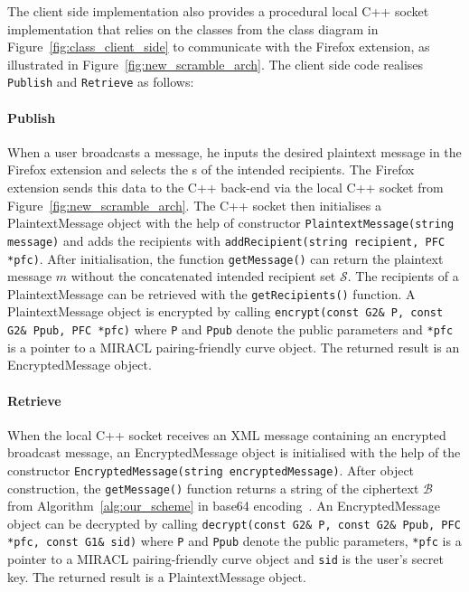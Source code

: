 The client side implementation also provides a procedural local C++ socket implementation that relies on the classes from the class diagram in Figure~\ref{fig:class_client_side} to communicate with the Firefox extension, as illustrated in Figure~\ref{fig:new_scramble_arch}. The client side code realises \texttt{Publish} and \texttt{Retrieve} as follows:

\paragraph{Publish}
When a user broadcasts a message, he inputs the desired plaintext message in the Firefox extension and selects the \id{}s of the intended recipients. The Firefox extension sends this data to the C++ back-end via the local C++ socket from Figure~\ref{fig:new_scramble_arch}. The C++ socket then initialises a PlaintextMessage object with the help of constructor \texttt{PlaintextMessage(string message)} and adds the recipients with \texttt{addRecipient(string recipient, PFC *pfc)}. After initialisation, the function \texttt{getMessage()} can return the plaintext message $m$ without the concatenated intended recipient set $\mathcal{S}$. The recipients of a PlaintextMessage can be retrieved with the \texttt{getRecipients()} function. A PlaintextMessage object is encrypted by calling \texttt{encrypt(const G2\& P, const G2\& Ppub, PFC *pfc)} where \texttt{P} and \texttt{Ppub} denote the public parameters and \texttt{*pfc} is a pointer to a MIRACL pairing-friendly curve object. The returned result is an EncryptedMessage object.


\paragraph{Retrieve}
When the local C++ socket receives an XML message containing an encrypted broadcast message, an EncryptedMessage object is initialised with the help of the constructor \texttt{EncryptedMessage(string encryptedMessage)}. After object construction, the \texttt{getMessage()} function returns a string of the ciphertext $\mathcal{B}$ from Algorithm~\ref{alg:our_scheme} in base64 encoding~\cite{rfc4648}. An EncryptedMessage object can be decrypted by calling \texttt{decrypt(const G2\& P, const G2\& Ppub, PFC *pfc, const G1\& s\textunderscore id)} where \texttt{P} and \texttt{Ppub} denote the public parameters, \texttt{*pfc} is a pointer to a MIRACL pairing-friendly curve object and \texttt{s\textunderscore id} is the user's secret key. The returned result is a PlaintextMessage object.

